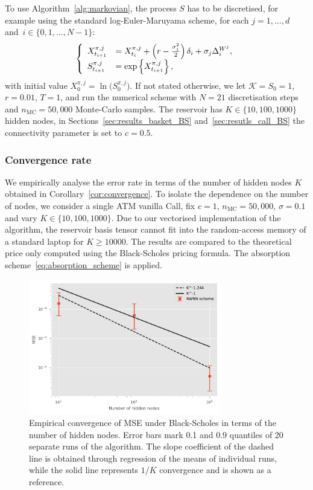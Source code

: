 To use Algorithm~\ref{alg:markovian}, the process $S$ has to be discretised, for example using the standard log-Euler-Maruyama scheme, for each $j=1,\ldots, d$ and~${i\in\{0,1,\dots,N-1\}}$:
\begin{equation*}
\left\{
\begin{array}{ll}
    X^{\pi, j}_{t_{i+1}} &= X^{\pi, j}_{t_{i}}
    + \left(r-\frac{\sigma_j^2}{2}\right)\delta_{i}  + \sigma_j\Delta^{W^j}_{i}, \\
    S^{\pi, j}_{t_{i+1}} &= \exp\left\{X^{\pi, j}_{t_{i+1}}\right\},
\end{array}
\right.
\end{equation*}
with initial value $X^{\pi, j}_0=\ln\big(S^{\pi, j}_0\big)$.
If not stated otherwise, we let $\mathscr{K}=S_0=1$, $r=0.01$, $T=1$,
and run the numerical scheme with $N=21$ discretisation steps and $n_{\mathrm{MC}}=50,000$ Monte-Carlo samples. 
The reservoir has $K\in\{10, 100, 1000\}$ hidden nodes, in Sections~\ref{sec:results_basket_BS} and~\ref{sec:resutls_call_BS} the connectivity parameter is set to $c=0.5$.

\subsubsection{Convergence rate}\label{sec:BS_convergence_rate}
We empirically analyse the error rate in terms of the number of hidden nodes $K$ obtained in Corollary~\ref{cor:convergence}. To isolate the dependence on the number of nodes, we consider a single ATM vanilla Call, fix $c=1$, $n_{\mathrm{MC}}=50,000$, $\sigma=0.1$ and vary $K\in\{10, 100, 1000\}$. Due to our vectorised implementation of the algorithm, the reservoir basis tensor cannot fit into the random-access memory of a standard laptop for $K \geq 10000$. The results are compared to the theoretical price only computed using the Black-Scholes pricing formula. The absorption scheme~\eqref{eq:absorption_scheme} is applied. 

\begin{figure}[hbt!]%
    \centering
    \includegraphics[width=0.75\textwidth]{content/reschap2/Figures/BS_convergence_K_1e3.pdf}
    \caption{Empirical convergence of MSE under Black-Scholes in terms of  the number of hidden nodes. Error bars mark 0.1 and 0.9 quantiles of 20 separate runs of the algorithm. The slope coefficient of the dashed line is obtained through regression of the means of individual runs, while the solid line represents $1/K$ convergence and is shown as a reference.}
    \label{fig:BSconvergence}
\end{figure}

